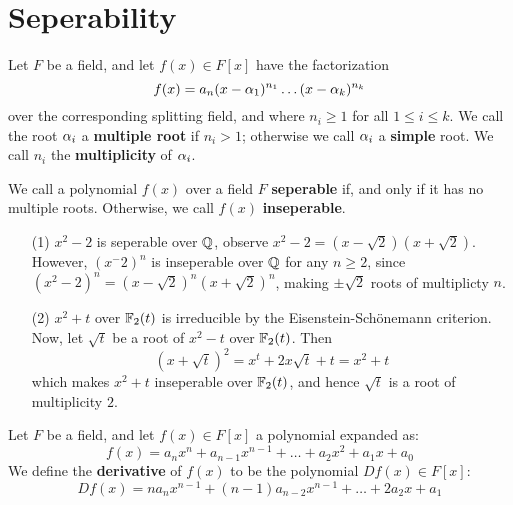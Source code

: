 \section{Seperability}
\label{section_8.6}

\begin{definition}
  Let $F$ be a field, and let $f(x) \in F[x]$ have the factorization
  \begin{equation*}
    f(x)=a_n(x-\alpha_1)^{n_1} \dots (x-\alpha_k)^{n_k}
  \end{equation*}
  over the corresponding splitting field, and where $n_i \geq 1$ for
  all $1 \leq i \leq k$. We call the root $\alpha_i$ a \textbf{multiple
  root} if $n_i>1$; otherwise we call $\alpha_i$ a \textbf{simple} root.
  We call $n_i$ the  \textbf{multiplicity} of $\alpha_i$.
\end{definition}

\begin{definition}
  We call a polynomial $f(x)$ over a field $F$ \textbf{seperable} if,
  and only if it has no multiple roots. Otherwise, we call $f(x)$
  \textbf{inseperable}.
\end{definition}

\begin{example}\label{example_8.14}
  \begin{enumerate}
    \item[(1)] $x^2-2$ is seperable over $\mathbb{Q}$, observe
      $x^2-2=(x-\sqrt{2})(x+\sqrt{2})$. However, $(x^-2)^n$ is
      inseperable over $\mathbb{Q}$ for any $n \geq 2$, since
      $(x^2-2)^n=(x-\sqrt{2})^n(x+\sqrt{2})^n$, making $\pm{\sqrt{2}}$
      roots of multiplicty $n$.

    \item[(2)] $x^2+t$ over  $\mathbb{F}_2(t)$ is irreducible by the
      Eisenstein-Sch\"onemann criterion. Now, let $\sqrt{t}$ be a root
      of $x^2-t$ over $\mathbb{F}_2(t)$. Then
      \begin{equation*}
        (x+\sqrt{t})^2=x^t+2x\sqrt{t}+t=x^2+t
      \end{equation*}
      which makes $x^2+t$ inseperable over $\mathbb{F}_2(t)$, and hence
      $\sqrt{t}$ is a root of multiplicity $2$.
  \end{enumerate}
\end{example}

\begin{definition}
  Let $F$ be a field, and let $f(x) \in F[x]$ a polynomial expanded
  as:
  \begin{equation*}
    f(x)=a_nx^n+a_{n-1}x^{n-1}+\dots+a_2x^2+a_1x+a_0
  \end{equation*}
  We define the \textbf{derivative} of $f(x)$ to be the polynomial
  $D{f(x)} \in F[x]$:
  \begin{equation*}
    D{f(x)}=na_nx^{n-1}+(n-1)a_{n-2}x^{n-1}+\dots+2a_2x+a_1
  \end{equation*}
\end{definition}

